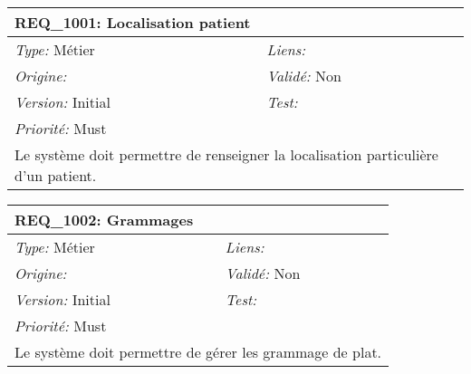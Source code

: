 \begin{table}[!h]

\begin{tabular}{|p{60mm}p{100mm}|}

\hline

\multicolumn{2}{|l|}{\textbf{REQ\_1001:} Localisation patient} \\ \hline

\emph{Type:} Métier & \emph{Liens:}  \\

\emph{Origine:}  & \emph{Validé:} Non \\

\emph{Version:} Initial & \emph{Test:}  \\

\emph{Priorité:} Must & \\ \hline

\multicolumn{2}{|p{16cm}|}{Le système doit permettre de renseigner la localisation particulière d'un patient.} \\ \hline

\end{tabular}

\end{table}



\begin{table}[!h]

\begin{tabular}{|p{60mm}p{100mm}|}

\hline

\multicolumn{2}{|l|}{\textbf{REQ\_1002:} Grammages} \\ \hline

\emph{Type:} Métier & \emph{Liens:}  \\

\emph{Origine:}  & \emph{Validé:} Non \\

\emph{Version:} Initial & \emph{Test:}  \\

\emph{Priorité:} Must & \\ \hline

\multicolumn{2}{|p{16cm}|}{Le système doit permettre de gérer les grammage de plat.} \\ \hline

\end{tabular}

\end{table}



